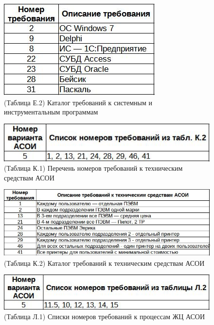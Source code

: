 \documentclass[12pt, a4paper, simple]{eskdtext}
\begin{document}
    \begin{figure}[ph!]
        \centering
        \includegraphics[]
            {_docs/КаталогТребованийКСистемнымИИнструментальнымПрограммам.jpg}
        \caption{(Таблица Е.2) Каталог требований к системным и инструментальным программам}
    \end{figure}

    \begin{figure}[ph!]
        \centering
        \includegraphics[]
            {_docs/ПереченьНомеровТребованийКТехническимСредствамАСОИ.jpg}
        \caption{(Таблица К.1) Перечень номеров требований к техническим средствам АСОИ}
    \end{figure}

    \begin{figure}[ph!]
        \centering
        \includegraphics[]
            {_docs/КаталогТребованийКТехническимСредствамАСОИ.jpg}
        \caption{(Таблица К.2) Каталог требований к техническим средствам АСОИ}
    \end{figure}

    \begin{figure}[ph!]
        \centering
        \includegraphics[]
            {_docs/СпискиНомеровТребованийКПроцессамЖЦАСОИ.jpg}
        \caption{(Таблица Л.1) Списки номеров требований к процессам ЖЦ АСОИ}
    \end{figure}
\end{document}
